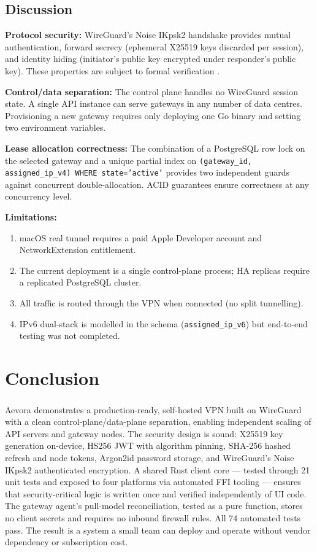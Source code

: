 \documentclass[12pt,a4paper]{report}
\newcommand{\wireguard}{WireGuard\textsuperscript{\textregistered}}
\begin{document}
\section{Discussion}

\textbf{Protocol security:} WireGuard's Noise IKpsk2 handshake provides mutual authentication, forward secrecy (ephemeral X25519 keys discarded per session), and identity hiding (initiator's public key encrypted under responder's public key). These properties are subject to formal verification \cite{donenfeld2017wireguard}.

\textbf{Control/data separation:} The control plane handles no WireGuard session state. A single API instance can serve gateways in any number of data centres. Provisioning a new gateway requires only deploying one Go binary and setting two environment variables.

\textbf{Lease allocation correctness:} The combination of a PostgreSQL row lock on the selected gateway and a unique partial index on \texttt{(gateway\_id, assigned\_ip\_v4) WHERE state='active'} provides two independent guards against concurrent double-allocation. ACID guarantees ensure correctness at any concurrency level.

\textbf{Limitations:}
\begin{enumerate}[leftmargin=*, topsep=2pt, itemsep=0pt]
  \item macOS real tunnel requires a paid Apple Developer account and NetworkExtension entitlement.
  \item The current deployment is a single control-plane process; HA replicas require a replicated PostgreSQL cluster.
  \item All traffic is routed through the VPN when connected (no split tunnelling).
  \item IPv6 dual-stack is modelled in the schema (\texttt{assigned\_ip\_v6}) but end-to-end testing was not completed.
\end{enumerate}

\chapter{Conclusion}

Aevora demonstrates a production-ready, self-hosted VPN built on \wireguard{} with a clean control-plane/data-plane separation, enabling independent scaling of API servers and gateway nodes. The security design is sound: X25519 key generation on-device, HS256 JWT with algorithm pinning, SHA-256 hashed refresh and node tokens, Argon2id password storage, and WireGuard's Noise IKpsk2 authenticated encryption. A shared Rust client core — tested through 21 unit tests and exposed to four platforms via automated FFI tooling — ensures that security-critical logic is written once and verified independently of UI code. The gateway agent's pull-model reconciliation, tested as a pure function, stores no client secrets and requires no inbound firewall rules. All 74 automated tests pass. The result is a system a small team can deploy and operate without vendor dependency or subscription cost.
\end{document}
